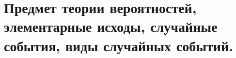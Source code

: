 \documentclass[polytech/stats/exam-2023/stats-exam-2023.tex]{subfiles}
\begin{document}
\section{Предмет теории вероятностей, элементарные исходы, случайные события, виды случайных событий.}
\end{document}

